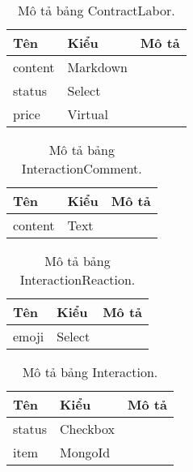 \begin{table}[p]
	\begin{center}
		\begin{tabular}{ |l|l|l| } 
			\hline
			Tên & Kiểu & Mô tả \\
			\hline
			content & Markdown & \dotfill \\
			status & Select & \dotfill \\
			price & Virtual & \dotfill \\ 
			\hline
		\end{tabular}
		\caption{Mô tả bảng ContractLabor.}
		\label{table:ContractLabor}
	\end{center}
\end{table}


\begin{table}[p]
	\begin{center}
		\begin{tabular}{ |l|l|l| } 
			\hline
			Tên & Kiểu & Mô tả \\
			\hline
			content & Text & \dotfill \\ 
			\hline
		\end{tabular}
		\caption{Mô tả bảng InteractionComment.}
		\label{table:InteractionComment}
	\end{center}
\end{table}


\begin{table}[p]
	\begin{center}
		\begin{tabular}{ |l|l|l| } 
			\hline
			Tên & Kiểu & Mô tả \\
			\hline
			emoji & Select & \dotfill \\ 
			\hline
		\end{tabular}
		\caption{Mô tả bảng InteractionReaction.}
		\label{table:InteractionReaction}
	\end{center}
\end{table}


\begin{table}[p]
	\begin{center}
		\begin{tabular}{ |l|l|l| } 
			\hline
			Tên & Kiểu & Mô tả \\
			\hline
			status & Checkbox & \dotfill \\
			item & MongoId & \dotfill \\ 
			\hline
		\end{tabular}
		\caption{Mô tả bảng Interaction.}
		\label{table:Interaction}
	\end{center}
\end{table}


